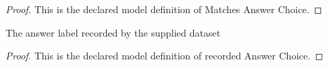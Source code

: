 \begin{proof}
  This is the declared model definition of Matches Answer Choice.
\end{proof}
\begin{definition}
  \label{def:physics:phyx-mini-0321:phyxminiproblems-problemphyxmini0321-recordedanswerchoice}
  The answer label recorded by the supplied dataset
\end{definition}
\begin{proof}
  This is the declared model definition of recorded Answer Choice.
\end{proof}
